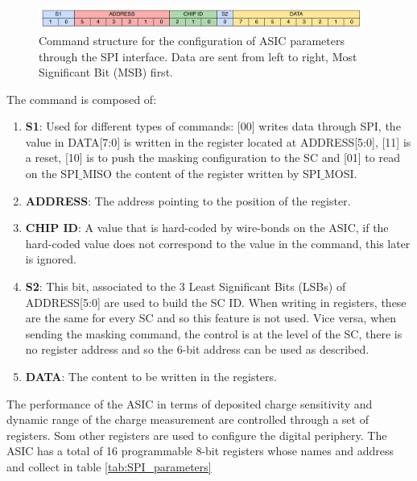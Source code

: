 		\begin{figure}[h]
			\centering
			\includegraphics[width=0.95\textwidth]{files/command_structure}
			\caption{Command structure for the configuration of ASIC parameters through the SPI interface. Data are sent from left to right, Most Significant Bit (MSB) first.}
			\label{im:command_structure}
		\end{figure}
		
		The command is composed of: 
		\begin{enumerate}
			\item \textbf{S1}: Used for different types of commands: [00] writes data through SPI, the value in DATA[7:0] is written in the register located at ADDRESS[5:0], [11] is a reset, [10] is to push the masking configuration to the SC and [01] to read on the SPI$\_$MISO the content of the register written by SPI$\_$MOSI. 
			\item \textbf{ADDRESS}: The address pointing to the position of the register.
			\item \textbf{CHIP ID}: A value that is hard-coded by wire-bonds on the ASIC, if the hard-coded value does not correspond to the value in the command, this later is ignored. 
			\item \textbf{S2}: This bit, associated to the 3 Least Significant Bits (LSBs) of ADDRESS[5:0] are used to build the SC ID. When writing in registers, these are the same for every SC and so this feature is not used. Vice versa, when sending the masking command, the control is at the level of the SC, there is no register address and so the 6-bit address can be used as described.
			\item \textbf{DATA}: The content to be written in the registers. 
		\end{enumerate}
		
		The performance of the ASIC in terms of deposited charge sensitivity and dynamic range of the charge measurement are controlled through a set of registers. Som other registers are used to configure the digital periphery. The ASIC has a total of 16 programmable 8-bit registers whose names and address and collect in table \ref{tab:SPI_parameters}
		
